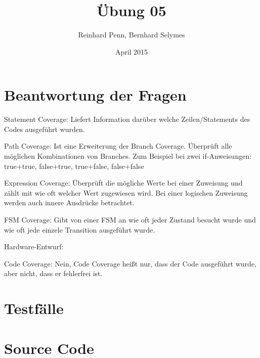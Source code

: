 \documentclass[12pt,a4paper]{article}
\begin{document}
\title{Übung 05}
\author{Reinhard Penn, Bernhard Selymes}
\date{April 2015}

\normalsize


\newcommand{\Uebung}{Coverage}
\newcommand{\srcpath}{../../src}
\newcommand{\simpath}{../../sim}



\section{Beantwortung der Fragen}
Statement Coverage: Liefert Information darüber welche Zeilen/Statements des Codes ausgeführt wurden.

Path Coverage: Ist eine Erweiterung der Branch Coverage. Überprüft alle möglichen Kombinationen von Branches. Zum Beispiel bei zwei if-Anweisungen: true+true, false+true, true+false, false+false

Expression Coverage: Überprüft die mögliche Werte bei einer Zuweisung und zählt mit wie oft welcher Wert zugewiesen wird. Bei einer logischen Zuweisung werden auch innere Ausdrücke betrachtet.

FSM Coverage: Gibt von einer FSM an wie oft jeder Zustand besucht wurde und wie oft jede einzele Transition ausgeführt wurde.

Hardware-Entwurf: %

Code Coverage: Nein, Code Coverage heißt nur, dass der Code ausgeführt wurde, aber nicht, dass er fehlerfrei ist.

\section{Testfälle}


\section{Source Code}

%
%
%
%
%
%
%
%
%
%
%
%
\end{document}
